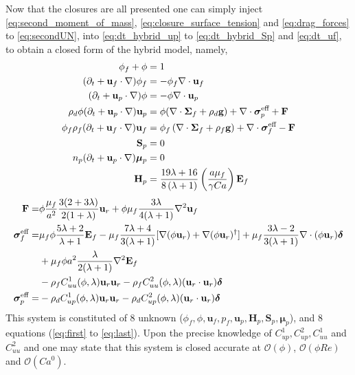 Now that the closures are all presented one can simply inject \ref{eq:second_moment_of_mass}, \ref{eq:closure_surface_tension} and \ref{eq:drag_forces} to \ref{eq:secondUN}, into  \ref{eq:dt_hybrid_up} to \ref{eq:dt_hybrid_Sp} and \ref{eq:dt_uf}, to obtain a closed form of the hybrid model, namely,  
\begin{align}
    \label{eq:first}
    \phi_f + \phi &= 1\\
    (\pddt + \textbf{u}_f  \cdot \grad) \phi_f
    &= - \phi_f \div \textbf{u}_f\\
    (\pddt + \textbf{u}_p \cdot \grad)\phi
    &=
    - \phi \div \textbf{u}_p\\
    \rho_d \phi (\pddt + \textbf{u}_p \cdot \grad)\textbf{u}_p
    &=
    \phi(\div \bm\Sigma_f
    + \rho_d  \textbf{g})
    + \div \bm\sigma_p^\text{eff}
    + \textbf{F}
    \\
    \phi_f \rho_f(\pddt + \textbf{u}_f  \cdot \grad) \textbf{u}_f
    &= \phi_f 
    \left(\div \bm{\Sigma}_f
    + \rho_f \textbf{g}\right)
    + \div \bm\sigma_f^\text{eff}
    -\textbf{F}\\
    \textbf{S}_p &= 0\\
    n_p (\pddt + \textbf{u}_p \cdot \grad)\bm\mu_p &= 0\\
    \textbf{H}_p
    &=
    \frac{19 \lambda + 16}{8 \left(\lambda + 1\right)}
    \left(\frac{a \mu_f}{\gamma Ca}\right)
    \textbf{E}_f
    \label{eq:last}
\end{align}
\begin{align}
    \textbf{F}=&
    \phi
    \frac{\mu_f}{a^2}
    \frac{3(2+3\lambda)}{2(1+\lambda)}\textbf{u}_r
    + \phi\mu_f  \frac{3\lambda}{4(\lambda +1)} \grad^2 \textbf{u}_f\\
    \bm\sigma_f^\text{eff}
    =&
     \mu_f \phi \frac{5\lambda +2}{\lambda+1} \textbf{E}_f
    - \mu_f \frac{7\lambda +4}{3(\lambda+1)} [
    \grad(\phi \textbf{u}_r)
    + \grad(\phi \textbf{u}_r)^\dagger]
    + \mu_f \frac{3\lambda - 2}{3(\lambda+1)} \div(\phi \textbf{u}_r)  \bm\delta\nonumber\\
    &+ \mu_f \phi a^2 \frac{\lambda}{2(\lambda+1)}\grad^2 \textbf{E}_f\\
    &-\rho_f C^1_{uu}(\phi,\lambda)  \textbf{u}_r \textbf{u}_r
    -\rho_f C^2_{uu} (\phi,\lambda) (\textbf{u}_r \cdot \textbf{u}_r)\bm\delta
    \label{eq:sigma_feffff}
    \\
    \bm\sigma_p^\text{eff}
    =&
    -\rho_d C^1_{up}(\phi,\lambda) \textbf{u}_r \textbf{u}_r
    -\rho_d C^2_{up}(\phi,\lambda) (\textbf{u}_r \cdot \textbf{u}_r)\bm\delta
\end{align}
This system is constituted of 8 unknown ($\phi_f,\phi,\textbf{u}_f,p_f,\textbf{u}_p,\textbf{H}_p,\textbf{S}_p,\bm\mu_p$), and 8 equations (\ref{eq:first} to \ref{eq:last}).  
Upon the precise knowledge of $C^1_{up}, C^2_{up}, C^1_{uu}$ and $C^2_{uu}$ and one may state that this system is closed accurate at $\mathcal{O}(\phi)$, $\mathcal{O}(\phi Re)$ and $\mathcal{O}(Ca^0)$. 

